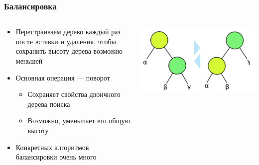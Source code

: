 \documentclass[xetex,mathserif,serif]{beamer}
\begin{document}
	\begin{frame}
		\frametitle{Балансировка}
		\begin{columns}
			\begin{column}{0.6\textwidth}
				\begin{itemize}
					\item Перестраиваем дерево каждый раз после вставки и удаления, чтобы сохранить высоту дерева возможно меньшей
					\item Основная операция --- поворот
					\begin{itemize}
						\item Сохраняет свойства двоичного дерева поиска
						\item Возможно, уменьшает его общую высоту
					\end{itemize}
					\item Конкретных алгоритмов балансировки очень много
				\end{itemize}
			\end{column}
			\begin{column}{0.4\textwidth}
				\begin{center}
					\includegraphics[width=\textwidth]{rotation.png}
				\end{center}
			\end{column}
		\end{columns}
	\end{frame}
\end{document}
